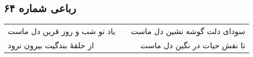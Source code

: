 \begin{center}
\section*{رباعی شماره ۶۴}
\label{sec:sh064}
\begin{longtable}{l p{0.5cm} r}
یاد تو شب و روز قرین دل ماست
&&
سودای دلت گوشه نشین دل ماست
\\
از حلقهٔ بندگیت بیرون نرود
&&
تا نقش حیات در نگین دل ماست
\\
\end{longtable}
\end{center}
